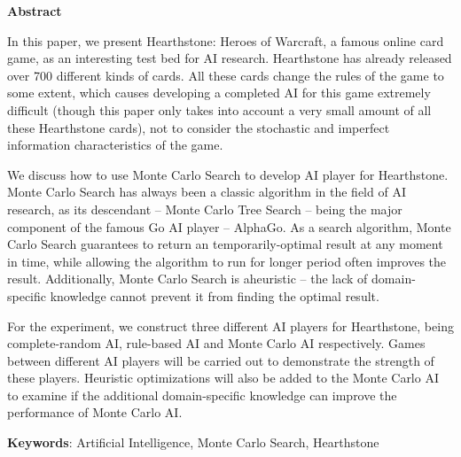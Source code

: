 \vspace{0.5cm}
{}
\centerline{\xiaoerhao \textbf{Abstract}}
\vspace{0.5cm}

In this paper, we present Hearthstone: Heroes of Warcraft, a famous online card game, as an interesting test bed for AI research. Hearthstone has already released over 700 different kinds of cards. All these cards change the rules of the game to some extent, which causes developing a completed AI for this game extremely difficult (though this paper only takes into account a very small amount of all these Hearthstone cards), not to consider the stochastic and imperfect information characteristics of the game.

We discuss how to use Monte Carlo Search to develop AI player for Hearthstone. Monte Carlo Search has always been a classic algorithm in the field of AI research, as its descendant -- Monte Carlo Tree Search -- being the major component of the famous Go AI player -- AlphaGo. As a search algorithm, Monte Carlo Search guarantees to return an temporarily-optimal result at any moment in time, while allowing the algorithm to run for longer period often improves the result. Additionally, Monte Carlo Search is aheuristic -- the lack of domain-specific knowledge cannot prevent it from finding the optimal result.

For the experiment, we construct three different AI players for Hearthstone, being complete-random AI, rule-based AI and Monte Carlo AI respectively. Games between different AI players will be carried out to demonstrate the strength of these players. Heuristic optimizations will also be added to the Monte Carlo AI to examine if the additional domain-specific knowledge can improve the performance of Monte Carlo AI.

\bigskip

\par\setlength\parindent{0em}\textbf{Keywords}: Artificial Intelligence, Monte Carlo Search, Hearthstone
\par\setlength\parindent{2em}
